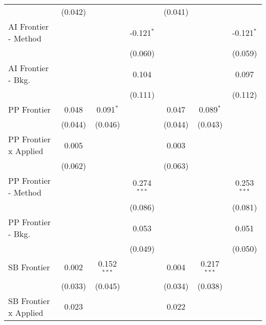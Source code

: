 \begin{tabular}{lcccccc}
                                & (0.042)        &               &               & (0.041)        &               &   \\   
   AI Frontier - Method         &                &               & -0.121$^{*}$  &                &               & -0.121$^{*}$\\   
                                &                &               & (0.060)       &                &               & (0.059)\\   
   AI Frontier - Bkg.           &                &               & 0.104         &                &               & 0.097\\   
                                &                &               & (0.111)       &                &               & (0.112)\\   
   PP Frontier                  & 0.048          & 0.091$^{*}$   &               & 0.047          & 0.089$^{*}$   &   \\   
                                & (0.044)        & (0.046)       &               & (0.044)        & (0.043)       &   \\   
   PP Frontier x Applied        & 0.005          &               &               & 0.003          &               &   \\   
                                & (0.062)        &               &               & (0.063)        &               &   \\   
   PP Frontier - Method         &                &               & 0.274$^{***}$ &                &               & 0.253$^{***}$\\   
                                &                &               & (0.086)       &                &               & (0.081)\\   
   PP Frontier - Bkg.           &                &               & 0.053         &                &               & 0.051\\   
                                &                &               & (0.049)       &                &               & (0.050)\\   
   SB Frontier                  & 0.002          & 0.152$^{***}$ &               & 0.004          & 0.217$^{***}$ &   \\   
                                & (0.033)        & (0.045)       &               & (0.034)        & (0.038)       &   \\   
   SB Frontier x Applied        & 0.023          &               &               & 0.022          &               &   \\   

\end{tabular}
